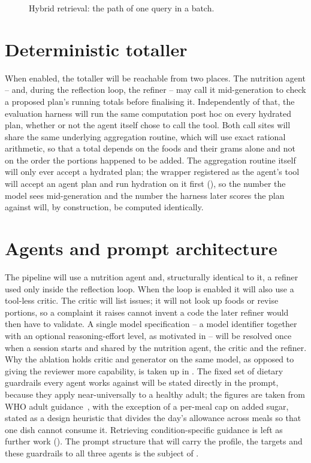 \begin{figure}[htbp]
    \centering
    
    \caption{Hybrid retrieval: the path of one query in a batch.}
    \label{fig:diagram-retrieval}
\end{figure}

\section{Deterministic totaller}
\label{sec:design-totaller}

When enabled, the totaller will be reachable from two places. The nutrition agent -- and, during the reflection loop, the refiner -- may call it mid-generation to check a proposed plan's running totals before finalising it. Independently of that, the evaluation harness will run the same computation post hoc on every hydrated plan, whether or not the agent itself chose to call the tool. Both call sites will share the same underlying aggregation routine, which will use exact rational arithmetic, so that a total depends on the foods and their grams alone and not on the order the portions happened to be added. The aggregation routine itself will only ever accept a hydrated plan; the wrapper registered as the agent's tool will accept an agent plan and run hydration on it first (), so the number the model sees mid-generation and the number the harness later scores the plan against will, by construction, be computed identically.

\section{Agents and prompt architecture}
\label{sec:design-agents}

The pipeline will use a nutrition agent and, structurally identical to it, a refiner used only inside the reflection loop. When the loop is enabled it will also use a tool-less critic. The critic will list issues; it will not look up foods or revise portions, so a complaint it raises cannot invent a code the later refiner would then have to validate. A single model specification -- a model identifier together with an optional reasoning-effort level, as motivated in  -- will be resolved once when a session starts and shared by the nutrition agent, the critic and the refiner. Why the ablation holds critic and generator on the same model, as opposed to giving the reviewer more capability, is taken up in . The fixed set of dietary guardrails every agent works against will be stated directly in the prompt, because they apply near-universally to a healthy adult; the figures are taken from WHO adult guidance~\cite{who2020healthy,who2012sodium,who2012potassium,whofao2003diet}, with the exception of a per-meal cap on added sugar, stated as a design heuristic that divides the day's allowance across meals so that one dish cannot consume it. Retrieving condition-specific guidance is left as further work (). The prompt structure that will carry the profile, the targets and these guardrails to all three agents is the subject of .


